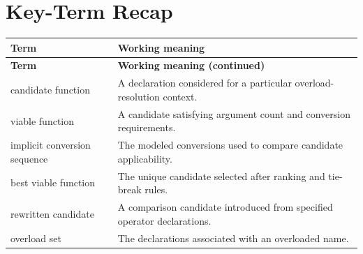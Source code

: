 \documentclass[11pt,letterpaper]{article}
\begin{document}
\section{Key-Term Recap}
\begin{longtable}{@{}>{\RaggedRight\arraybackslash}p{}>{\RaggedRight\arraybackslash}p{}@{}}\toprule\textbf{Term} & \textbf{Working meaning}\\\midrule\endfirsthead\toprule\textbf{Term} & \textbf{Working meaning (continued)}\\\midrule\endhead\bottomrule\endfoot
candidate function & A declaration considered for a particular overload-resolution context.\\
viable function & A candidate satisfying argument count and conversion requirements.\\
implicit conversion sequence & The modeled conversions used to compare candidate applicability.\\
best viable function & The unique candidate selected after ranking and tie-break rules.\\
rewritten candidate & A comparison candidate introduced from specified operator declarations.\\
overload set & The declarations associated with an overloaded name.\\
\end{longtable}
\end{document}
